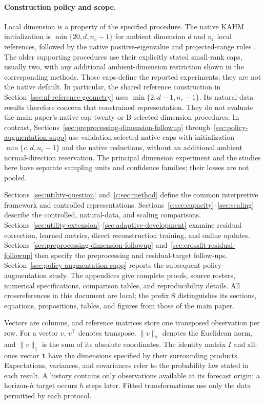 \documentclass[10pt]{article}
\begin{document}
\paragraph{Construction policy and scope.}
Local dimension is a property of the specified procedure. The native
KAHM initialization is $\min\{20,d,n_c-1\}$ for ambient dimension $d$
and $n_c$ local references, followed by the native positive-eigenvalue
and projected-range rules \citep[Appendix B]{Kumar2025Collaborative}.
The older supporting procedures use their explicitly stated small-rank
caps, usually two, with any additional ambient-dimension restriction
shown in the corresponding methods. Those caps define the reported
experiments; they are not the native default. In particular,
the shared reference construction in Section~\ref{sec:nf-reference-geometry}
uses $\min\{2,d-1,n_c-1\}$. Its natural-data results therefore concern
that constrained representation. They do not evaluate the main paper's
native-cap-twenty or B-selected dimension procedures. In contrast,
Sections~\ref{sec:preprocessing-dimension-followup}
through~\ref{sec:policy-augmentation-supp} use validation-selected native
caps with initialization $\min\{c,d,n_c-1\}$ and the native reductions,
without an additional ambient normal-direction reservation. The
principal dimension experiment and the studies here have separate
sampling units and confidence families; their losses are not pooled.

Sections~\ref{sec:utility-question} and~\ref{c:sec:method} define the common
interpretive framework and controlled representations.
Sections~\ref{c:sec:capacity}--\ref{sec:scaling} describe the controlled,
natural-data, and scaling comparisons.
Sections~\ref{sec:utility-extension}--\ref{sec:adaptive-development}
examine residual correction, learned metrics, direct reconstruction
training, and online updates.
Sections~\ref{sec:preprocessing-dimension-followup}
and~\ref{sec:crossfit-residual-followup} then specify the preprocessing
and residual-target follow-ups. Section~\ref{sec:policy-augmentation-supp}
reports the subsequent policy-augmentation study. The appendices give complete proofs,
source rosters, numerical specifications, comparison tables, and
reproducibility details. All crossreferences in this document are local;
the prefix S distinguishes its sections, equations, propositions, tables,
and figures from those of the main paper.

Vectors are columns, and reference matrices store one transposed
observation per row. For a vector $v$, $v^\top$ denotes transpose,
$\|v\|_2$ denotes the Euclidean norm, and $\|v\|_1$ is the sum of its
absolute coordinates. The identity matrix $I$ and all-ones vector
$\mathbf1$ have the dimensions specified by their surrounding products.
Expectations, variances, and covariances refer to the probability law
stated in each result. A history contains only observations available at
its forecast origin; a horizon-$h$ target occurs $h$ steps later.
Fitted transformations use only the data permitted by each protocol.
\end{document}

